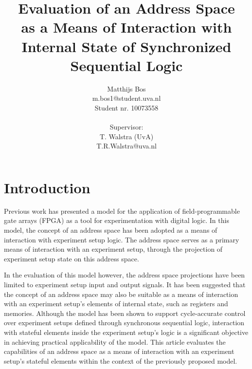 \documentclass{article}
\title{Evaluation of an Address Space\\ as a Means of Interaction with \\Internal State of Synchronized Sequential Logic}
\author{Matthijs Bos\\m.bos1@student.uva.nl\\Student nr. 10073558\\\\Supervisor:\\T. Walstra (UvA)\\ T.R.Walstra@uva.nl}
\begin{document}
\maketitle

\section{Introduction}

Previous work \cite{bos2016model} has presented a model for the application of field-programmable gate arrays (FPGA) as a tool for experimentation with digital logic. In this model, the concept of an address space has been adopted as a means of interaction with experiment setup logic. The address space serves as a primary means of interaction with an experiment setup, through the projection of experiment setup state on this address space. 

In the evaluation of this model however, the address space projections have been limited to experiment setup input and output signals. It has been suggested that the concept of an address space may also be suitable as a means of interaction with an experiment setup's elements of internal state, such as registers and memories. Although the model has been shown to support cycle-accurate control over experiment setups defined through synchronous sequential logic, interaction with stateful elements inside the experiment setup's logic is a significant objective in achieving practical applicability of the model. This article evaluates the capabilities of an address space as a means of interaction with an experiment setup's stateful elements within the context of the previously proposed model. 


\end{document}
